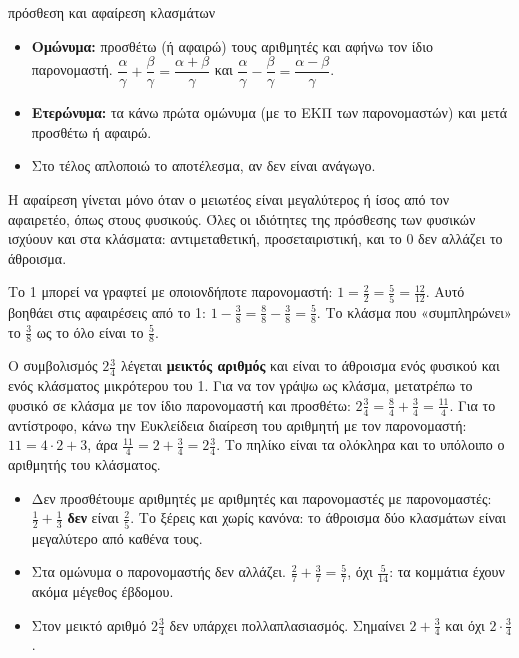 
\begin{kanonas}{πρόσθεση και αφαίρεση κλασμάτων}
\begin{itemize}[leftmargin=1.2em,itemsep=0.3ex,topsep=2pt]
\item \textbf{Ομώνυμα:} προσθέτω (ή αφαιρώ) τους αριθμητές και αφήνω τον ίδιο παρονομαστή. $\dfrac{\alpha}{\gamma}+\dfrac{\beta}{\gamma}=\dfrac{\alpha+\beta}{\gamma}$ και $\dfrac{\alpha}{\gamma}-\dfrac{\beta}{\gamma}=\dfrac{\alpha-\beta}{\gamma}$.
\item \textbf{Ετερώνυμα:} τα κάνω πρώτα ομώνυμα (με το ΕΚΠ των παρονομαστών) και μετά προσθέτω ή αφαιρώ.
\item Στο τέλος απλοποιώ το αποτέλεσμα, αν δεν είναι ανάγωγο.
\end{itemize}
\end{kanonas}

Η αφαίρεση γίνεται μόνο όταν ο μειωτέος είναι μεγαλύτερος ή ίσος από τον αφαιρετέο, όπως στους φυσικούς. Όλες οι ιδιότητες της πρόσθεσης των φυσικών ισχύουν και στα κλάσματα: αντιμεταθετική, προσεταιριστική, και το 0 δεν αλλάζει το άθροισμα.


Το 1 μπορεί να γραφτεί με οποιονδήποτε παρονομαστή: $1=\frac{2}{2}=\frac{5}{5}=\frac{12}{12}$. Αυτό βοηθάει στις αφαιρέσεις από το 1: $1-\frac{3}{8}=\frac{8}{8}-\frac{3}{8}=\frac{5}{8}$. Το κλάσμα που «συμπληρώνει» το $\frac{3}{8}$ ως το όλο είναι το $\frac{5}{8}$.


Ο συμβολισμός $2\frac{3}{4}$ λέγεται \textbf{μεικτός αριθμός} και είναι το άθροισμα ενός φυσικού και ενός κλάσματος μικρότερου του 1. Για να τον γράψω ως κλάσμα, μετατρέπω το φυσικό σε κλάσμα με τον ίδιο παρονομαστή και προσθέτω: $2\frac{3}{4}=\frac{8}{4}+\frac{3}{4}=\frac{11}{4}$. Για το αντίστροφο, κάνω την Ευκλείδεια διαίρεση του αριθμητή με τον παρονομαστή: $11=4\cdot 2+3$, άρα $\frac{11}{4}=2+\frac{3}{4}=2\frac{3}{4}$. Το πηλίκο είναι τα ολόκληρα και το υπόλοιπο ο αριθμητής του κλάσματος.

\begin{prosoxi}
\begin{itemize}[leftmargin=1.2em,itemsep=0.3ex,topsep=2pt]
\item Δεν προσθέτουμε αριθμητές με αριθμητές και παρονομαστές με παρονομαστές: $\frac{1}{2}+\frac{1}{3}$ \textbf{δεν} είναι $\frac{2}{5}$. Το ξέρεις και χωρίς κανόνα: το άθροισμα δύο κλασμάτων είναι μεγαλύτερο από καθένα τους.
\item Στα ομώνυμα ο παρονομαστής δεν αλλάζει. $\frac{2}{7}+\frac{3}{7}=\frac{5}{7}$, όχι $\frac{5}{14}$: τα κομμάτια έχουν ακόμα μέγεθος έβδομου.
\item Στον μεικτό αριθμό $2\frac{3}{4}$ δεν υπάρχει πολλαπλασιασμός. Σημαίνει $2+\frac{3}{4}$ και όχι $2\cdot\frac{3}{4}$.
\end{itemize}
\end{prosoxi}

